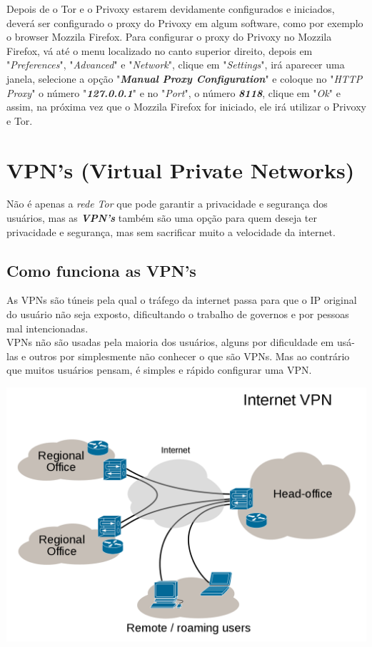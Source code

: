 \documentclass[12pt, letterpaper, DejaVuSansMono:12]{report}
\begin{document}
	Depois de o Tor e o Privoxy estarem devidamente configurados e iniciados, deverá ser configurado o proxy do Privoxy em algum software, como por exemplo o browser Mozzila Firefox. Para configurar o proxy do Privoxy no Mozzila Firefox, vá até o menu localizado no canto superior direito, depois em "\textit{Preferences}", "\textit{Advanced}" e "\textit{Network}", clique em "\textit{Settings}", irá aparecer uma janela, selecione a opção "\textit{\textbf{Manual Proxy Configuration}}" e coloque no "\textit{HTTP Proxy}" o número "\textit{\textbf{127.0.0.1}}" e no "\textit{Port}", o número \textit{\textbf{8118}}, clique em "\textit{Ok}" e assim, na próxima vez que o Mozzila Firefox for iniciado, ele irá utilizar o Privoxy e Tor.\\

\pagebreak

\section{VPN's (Virtual Private Networks)}
	Não é apenas a \textit{rede Tor} que pode garantir a privacidade e segurança dos usuários, mas as \textit{\textbf{VPN's}} também são uma opção para quem deseja ter privacidade e segurança, mas sem sacrificar muito a velocidade da internet.

\subsection{Como funciona as VPN's}
	As VPNs são túneis pela qual o tráfego da internet passa para que o IP original do usuário não seja exposto, dificultando o trabalho de governos e por pessoas mal intencionadas.\\

	VPNs não são usadas pela maioria dos usuários, alguns por dificuldade em usá-las e outros por simplesmente não conhecer o que são VPNs. Mas ao contrário que muitos usuários pensam, é simples e rápido configurar uma VPN.

\begin{center}
	\includegraphics[scale=0.44]{vpn.png}
\end{center}
\end{document}
